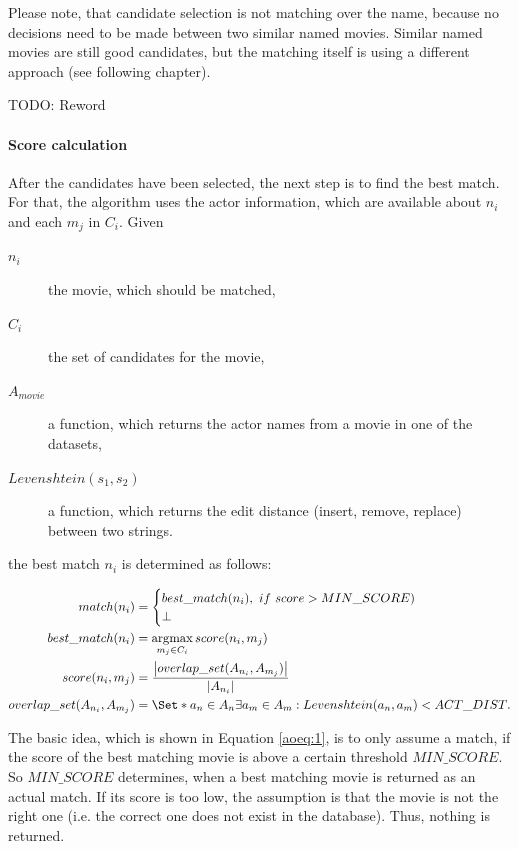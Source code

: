 Please note, that candidate selection is not matching over the name, because no decisions need to be made between two similar named movies.
Similar named movies are still good candidates, but the matching itself is using a different approach (see following chapter).

TODO: Reword

\paragraph{Score calculation}
After the candidates have been selected, the next step is to find the best match.
For that, the algorithm uses the actor information, which are available about $n_i$ and each $m_j$ in $C_i$.
Given
\begin{description}
	\item[$n_i$] the movie, which should be matched,
	\item[$C_i$] the set of candidates for the movie,
	\item[$A_{movie}$] a function, which returns the actor names from a movie in one of the datasets,
	\item[$Levenshtein(s_1, s_2)$] a function, which returns the edit distance (insert, remove, replace) between two strings.
\end{description}
the best match $n_i$ is determined as follows:

\begin{align}
	match(n_i) &=
		\begin{cases}
			best\_match(n_i),~if~score > MIN\_SCORE) \\
			\bot
		\end{cases}\label{aoeq:1}\\
	best\_match(n_i) &=
		\argmax_{m_j \in C_i} score(n_i, m_j)\label{aoeq:2}\\
	score(n_i, m_j) &=
		\frac
			{\left\lvert overlap\_set(A_{n_i}, A_{m_j}) \right\rvert}
			{\left\lvert A_{n_i} \right\rvert}\label{aoeq:3}\\
	overlap\_set(A_{n_i}, A_{m_j}) &=
		\Set*{a_n \in A_n}{\exists a_m \in A_m: Levenshtein(a_n, a_m) < ACT\_DIST}.\label{aoeq:4}
\end{align}

The basic idea, which is shown in Equation \ref{aoeq:1}, is to only assume a match, if the score of the best matching movie is above a certain threshold $MIN\_SCORE$.
So $MIN\_SCORE$ determines, when a best matching movie is returned as an actual match.
If its score is too low, the assumption is that the movie is not the right one (i.e. the correct one does not exist in the database).
Thus, nothing is returned.

